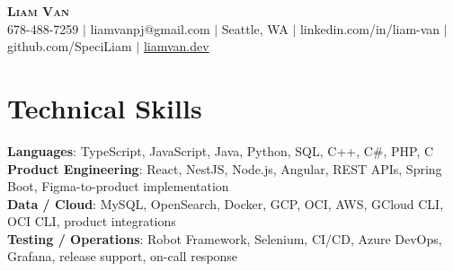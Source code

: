 \documentclass[letterpaper,11pt]{article}
\begin{document}

%
\begin{center}
    \textbf{\Huge \scshape Liam Van} \\ \vspace{1pt}
    \small 678-488-7259 $|$ liamvanpj@gmail.com $|$ Seattle, WA $|$
    linkedin.com/in/liam-van $|$ github.com/SpeciLiam $|$ \href{https://liamvan.dev}{liamvan.dev}

\end{center}

\section{Technical Skills}
 \begin{itemize}[leftmargin=0.15in, label={}]
    \small{\item{
     \textbf{Languages}{: TypeScript, JavaScript, Java, Python, SQL, C++, C\#, PHP, C} \\
     \textbf{Product Engineering}{: React, NestJS, Node.js, Angular, REST APIs, Spring Boot, Figma-to-product implementation} \\
     \textbf{Data / Cloud}{: MySQL, OpenSearch, Docker, GCP, OCI, AWS, GCloud CLI, OCI CLI, product integrations} \\
     \textbf{Testing / Operations}{: Robot Framework, Selenium, CI/CD, Azure DevOps, Grafana, release support, on-call response} \\
    }}
 \end{itemize}
%

\end{document}
